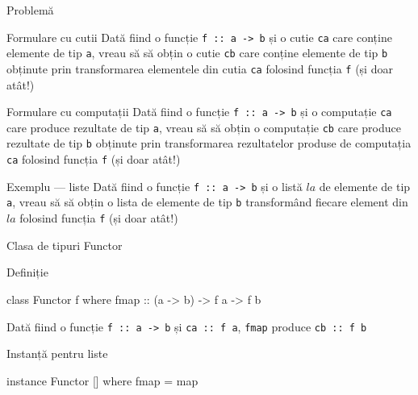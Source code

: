 \documentclass[xcolor=pdftex,romanian,colorlinks]{beamer}
\begin{document}
\begin{frame}[fragile]{Problemă}
\begin{block}{Formulare cu cutii}
Dată fiind o funcție \lstinline$f :: a -> b$ și o cutie \lstinline$ca$ care conține elemente de tip \lstinline$a$, vreau să să obțin o cutie \lstinline$cb$ care conține elemente de tip \lstinline$b$ obținute prin transformarea elementele din cutia \lstinline$ca$ folosind funcția \lstinline$f$ (și doar atât!)
\end{block}

\begin{block}{Formulare cu computații}
Dată fiind o funcție \lstinline$f :: a -> b$ și o computație \lstinline$ca$ care produce rezultate de tip \lstinline$a$, vreau să să obțin o computație \lstinline$cb$ care produce rezultate de tip \lstinline$b$ obținute prin transformarea rezultatelor produse de computația \lstinline$ca$ folosind funcția \lstinline$f$ (și doar atât!)
\end{block}

\begin{block}{Exemplu --- liste}
Dată fiind o funcție \lstinline$f :: a -> b$ și o listă $la$ de elemente de tip \lstinline$a$, vreau să să obțin o lista  de elemente de tip \lstinline$b$ transformând fiecare element din $la$ folosind funcția \lstinline$f$ (și doar atât!)
\end{block}

\end{frame}

\begin{frame}[fragile]{Clasa de tipuri Functor}
\begin{block}{Definiție}
\begin{asciihs}
class Functor f where
  fmap :: (a -> b) -> f a -> f b
\end{asciihs}

Dată fiind o funcție \lstinline$f :: a -> b$ și \lstinline$ca :: f a$, \lstinline$fmap$ produce \lstinline$cb :: f b$ \color{gray}{obținută prin transformarea rezultatelor produse de computația \lstinline$ca$ folosind funcția \lstinline$f$ (și doar atât!)}

\end{block}
\vfill
\begin{block}{Instanță pentru liste}
\begin{asciihs}
instance Functor [] where
  fmap = map
\end{asciihs}
\end{block}
\end{frame}
\end{document}
